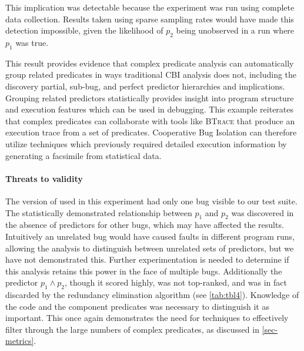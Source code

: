This implication was detectable because the experiment was run using complete data collection.  Results taken using sparse sampling rates would have made this detection impossible, given the likelihood of $p_2$ being unobserved in a run where $p_1$ was true.

This result provides evidence that complex predicate analysis can automatically group related predicates in ways traditional CBI analysis does not, including the discovery partial, sub-bug, and perfect predictor hierarchies and implications.  Grouping related predictors statistically provides insight into program structure and execution features which can be used in debugging.  This example reiterates that complex predicates can collaborate with tools like \textsc{BTrace} that produce an execution trace from a set of predicates.  Cooperative Bug Isolation can therefore utilize techniques which previously required detailed execution information by generating a facsimile from statistical data.

\paragraph{Threats to validity}

The version of  used in this experiment had only one bug visible to our test suite.  The statistically demonstrated relationship between $p_1$ and $p_2$ was discovered in the absence of predictors for other bugs, which may have affected the results.  Intuitively an unrelated bug would have caused faults in different program runs, allowing the analysis to distinguish between unrelated sets of predictors, but we have not demonstrated this.  Further experimentation is needed to determine if this analysis retains this power in the face of multiple bugs.  Additionally the predictor $p_1 \wedge p_2$, though it scored highly, was not top-ranked, and was in fact discarded by the redundancy elimination algorithm (see \autoref{tab:tbl4}).  Knowledge of the code and the component predicates was necessary to distinguish it as important.  This once again demonstrates the need for techniques to effectively filter through the large numbers of complex predicates, as discussed in \autoref{sec-metrics}.
